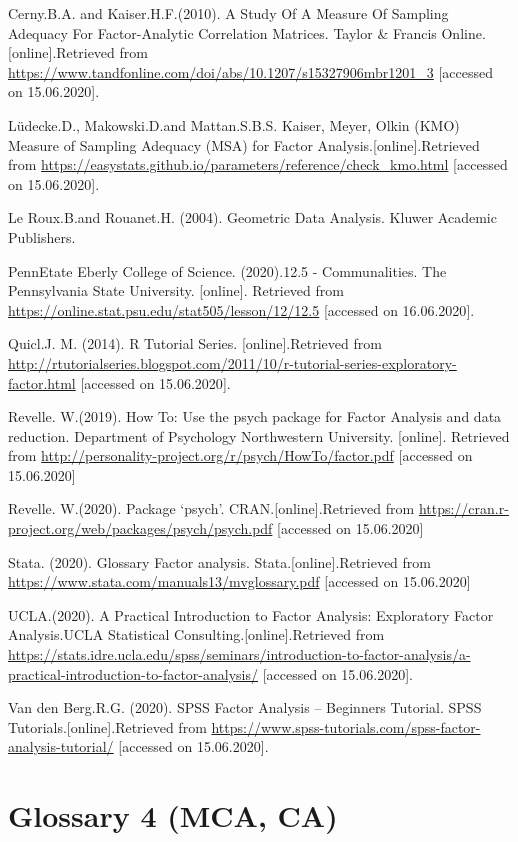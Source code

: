 \documentclass[]{book}
\begin{document}
Cerny.B.A. and Kaiser.H.F.(2010). A Study Of A Measure Of Sampling Adequacy For Factor-Analytic Correlation Matrices. Taylor \& Francis Online. {[}online{]}.Retrieved from \url{https://www.tandfonline.com/doi/abs/10.1207/s15327906mbr1201_3} {[}accessed on 15.06.2020{]}.

Lüdecke.D., Makowski.D.and Mattan.S.B.S. Kaiser, Meyer, Olkin (KMO) Measure of Sampling Adequacy (MSA) for Factor Analysis.{[}online{]}.Retrieved from \url{https://easystats.github.io/parameters/reference/check_kmo.html} {[}accessed on 15.06.2020{]}.

Le Roux.B.and Rouanet.H. (2004). Geometric Data Analysis. Kluwer Academic Publishers.

PennEtate Eberly College of Science. (2020).12.5 - Communalities. The Pennsylvania State University. {[}online{]}. Retrieved from \url{https://online.stat.psu.edu/stat505/lesson/12/12.5} {[}accessed on 16.06.2020{]}.

Quicl.J. M. (2014). R Tutorial Series. {[}online{]}.Retrieved from \url{http://rtutorialseries.blogspot.com/2011/10/r-tutorial-series-exploratory-factor.html} {[}accessed on 15.06.2020{]}.

Revelle. W.(2019). How To: Use the psych package for Factor Analysis and data reduction. Department of Psychology
Northwestern University. {[}online{]}. Retrieved from \url{http://personality-project.org/r/psych/HowTo/factor.pdf} {[}accessed on 15.06.2020{]}

Revelle. W.(2020). Package `psych'. CRAN.{[}online{]}.Retrieved from \url{https://cran.r-project.org/web/packages/psych/psych.pdf} {[}accessed on 15.06.2020{]}

Stata. (2020). Glossary Factor analysis. Stata.{[}online{]}.Retrieved from \url{https://www.stata.com/manuals13/mvglossary.pdf} {[}accessed on 15.06.2020{]}

UCLA.(2020). A Practical Introduction to Factor Analysis: Exploratory Factor Analysis.UCLA Statistical Consulting.{[}online{]}.Retrieved from \url{https://stats.idre.ucla.edu/spss/seminars/introduction-to-factor-analysis/a-practical-introduction-to-factor-analysis/} {[}accessed on 15.06.2020{]}.

Van den Berg.R.G. (2020). SPSS Factor Analysis -- Beginners Tutorial. SPSS Tutorials.{[}online{]}.Retrieved from \url{https://www.spss-tutorials.com/spss-factor-analysis-tutorial/} {[}accessed on 15.06.2020{]}.

\hypertarget{glossary-4-mca-ca}{%
\chapter{Glossary 4 (MCA, CA)}\label{glossary-4-mca-ca}}
\end{document}
